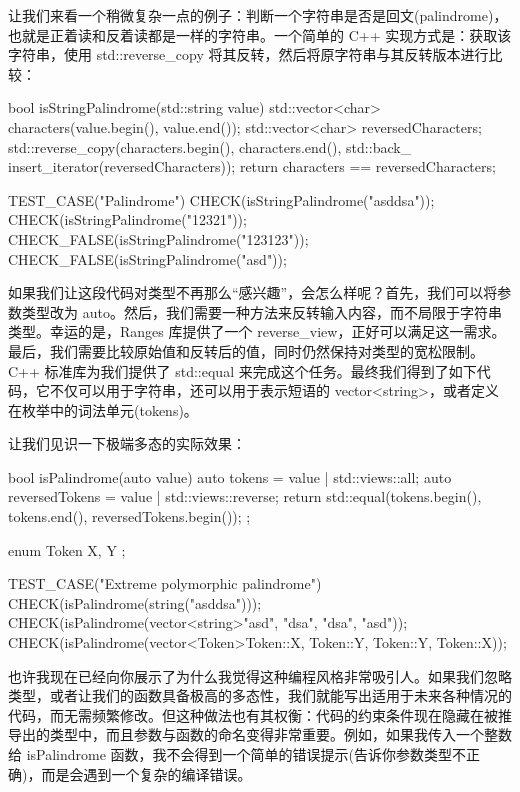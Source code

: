 让我们来看一个稍微复杂一点的例子：判断一个字符串是否是回文(palindrome)，也就是正着读和反着读都是一样的字符串。一个简单的 C++ 实现方式是：获取该字符串，使用 std::reverse\_copy 将其反转，然后将原字符串与其反转版本进行比较：

\begin{cpp}
bool isStringPalindrome(std::string value){
  std::vector<char> characters(value.begin(), value.end());
  std::vector<char> reversedCharacters;
  std::reverse_copy(characters.begin(), characters.end(), std::back_
  insert_iterator(reversedCharacters));
  return characters == reversedCharacters;
}

TEST_CASE("Palindrome"){
  CHECK(isStringPalindrome("asddsa"));
  CHECK(isStringPalindrome("12321"));
  CHECK_FALSE(isStringPalindrome("123123"));
  CHECK_FALSE(isStringPalindrome("asd"));
}
\end{cpp}

如果我们让这段代码对类型不再那么“感兴趣”，会怎么样呢？首先，我们可以将参数类型改为 auto。然后，我们需要一种方法来反转输入内容，而不局限于字符串类型。幸运的是，Ranges 库提供了一个 reverse\_view，正好可以满足这一需求。最后，我们需要比较原始值和反转后的值，同时仍然保持对类型的宽松限制。C++ 标准库为我们提供了 std::equal 来完成这个任务。最终我们得到了如下代码，它不仅可以用于字符串，还可以用于表示短语的 vector<string>，或者定义在枚举中的词法单元(tokens)。

让我们见识一下极端多态的实际效果：

\begin{cpp}
bool isPalindrome(auto value){
  auto tokens = value | std::views::all;
  auto reversedTokens = value | std::views::reverse;
  return std::equal(tokens.begin(), tokens.end(), reversedTokens.begin());
};

enum Token{
  X, Y
};

TEST_CASE("Extreme polymorphic palindrome"){
  CHECK(isPalindrome(string("asddsa")));
  CHECK(isPalindrome(vector<string>{"asd", "dsa", "dsa", "asd"}));
  CHECK(isPalindrome(vector<Token>{Token::X, Token::Y, Token::Y, Token::X}));
}
\end{cpp}

也许我现在已经向你展示了为什么我觉得这种编程风格非常吸引人。如果我们忽略类型，或者让我们的函数具备极高的多态性，我们就能写出适用于未来各种情况的代码，而无需频繁修改。但这种做法也有其权衡：代码的约束条件现在隐藏在被推导出的类型中，而且参数与函数的命名变得非常重要。例如，如果我传入一个整数给 isPalindrome 函数，我不会得到一个简单的错误提示(告诉你参数类型不正确)，而是会遇到一个复杂的编译错误。


